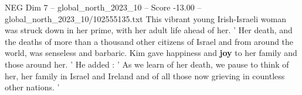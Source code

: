 \begin{textsample}{NEG Dim 7 – global\_north\_2023\_10 – Score -13.00 – global\_north\_2023\_10/102555135.txt}
This vibrant young Irish-Israeli woman was struck down in her prime, with her adult life ahead of her. ' Her death, and the deaths of more than a thousand other citizens of Israel and from around the world, was senseless and barbaric.
Kim gave happiness and \textbf{joy} to her family and those around her. ' He added : ' As we learn of her death, we pause to think of her, her family in Israel and Ireland and of all those now grieving in countless other nations. '

\end{textsample}
